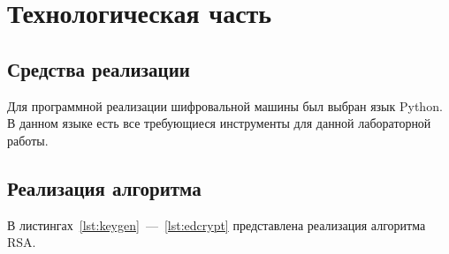 \chapter{Технологическая часть}

\section{Средства реализации}

Для программной реализации шифровальной машины был выбран язык Python. В данном языке есть все требующиеся инструменты для данной лабораторной работы.

\section{Реализация алгоритма}

В листингах~\ref{lst:keygen}~---~\ref{lst:edcrypt} представлена реализация алгоритма RSA.

